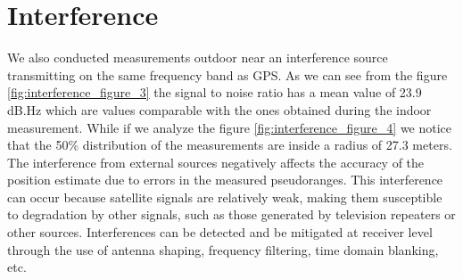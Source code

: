 \section{Interference}
\label{sec:interference}
We also conducted measurements outdoor near an interference source transmitting on the same frequency band as GPS. As we can see from the figure \ref{fig:interference_figure_3} the signal to noise ratio has a mean value of 23.9 dB.Hz which are values comparable with the ones obtained during the indoor measurement. While if we analyze the figure \ref{fig:interference_figure_4} we notice that the 50\% distribution of the measurements are inside a radius of 27.3 meters. The interference from external sources negatively affects the accuracy of the position estimate due to errors in the measured pseudoranges. This interference can occur because satellite signals are relatively weak, making them susceptible to degradation by other signals, such as those generated by television repeaters or other sources.
Interferences can be detected and be mitigated at receiver level through the use of antenna shaping, frequency filtering, time domain blanking, etc.


